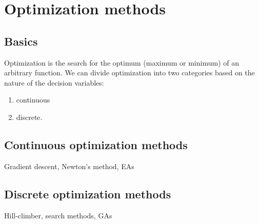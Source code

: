 \section{Optimization methods}
\subsection{Basics}
Optimization is the search for the optimum (maximum or minimum) of an arbitrary function. 
We can divide optimization into two categories based on the nature of the decision variables:
\begin{enumerate}
    \item continuous
    \item discrete.
\end{enumerate}
\subsection{Continuous optimization methods}
Gradient descent, Newton's method, EAs
\subsection{Discrete optimization methods}
Hill-climber, search methods, GAs